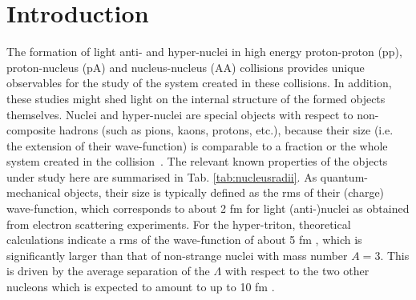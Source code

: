 \section{Introduction} 
The formation of light anti- and hyper-nuclei in high energy proton-proton (pp), proton-nucleus (pA) and nucleus-nucleus (AA) collisions provides unique observables for the study of the system created in these collisions. In addition, these studies might shed light on the internal structure of the formed objects themselves. 
Nuclei and hyper-nuclei are special objects with respect to non-composite hadrons (such as pions, kaons, protons, etc.), because their size (i.e. the extension of their wave-function) is comparable to a fraction or the whole system created in the collision~\cite{Adam:2015vna}.  
The relevant known properties of the objects under study here are summarised in Tab. \ref{tab:nucleusradii}.
As quantum-mechanical objects, their size is typically defined as the rms of their (charge) wave-function, which corresponds to about 2 fm for light (anti-)nuclei as obtained from electron scattering experiments. 
For the hyper-triton, theoretical calculations indicate a rms of the wave-function of about 5 fm \cite{Nemura:1999qp}, which is significantly larger than that of non-strange nuclei with mass number $A = 3$. This is driven by the average separation of the $\Lambda$ with respect to the two other nucleons which is expected to amount to up to 10 fm \cite{Nemura:1999qp}. 



